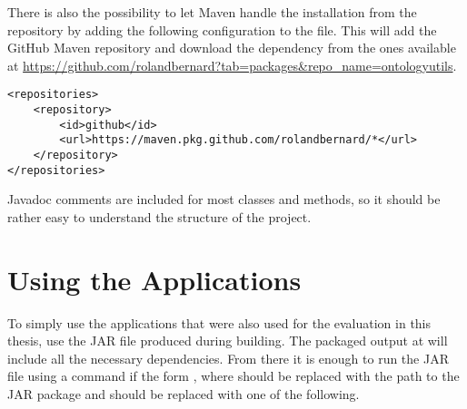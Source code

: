 There is also the possibility to let Maven handle the installation from the repository by adding the following configuration to the  file. This will add the GitHub Maven repository and download the dependency from the ones available at \url{https://github.com/rolandbernard?tab=packages&repo_name=ontologyutils}.

\begin{lstlisting}
<repositories>
    <repository>
        <id>github</id>
        <url>https://maven.pkg.github.com/rolandbernard/*</url>
    </repository>
</repositories>
\end{lstlisting}

Javadoc comments are included for most classes and methods, so it should be rather easy to understand the structure of the project.

\section{Using the Applications}

To simply use the applications that were also used for the evaluation in this thesis, use the JAR file produced during building. The packaged output at  will include all the necessary dependencies. From there it is enough to run the JAR file using a command if the form , where  should be replaced with the path to the JAR package and  should be replaced with one of the following.


